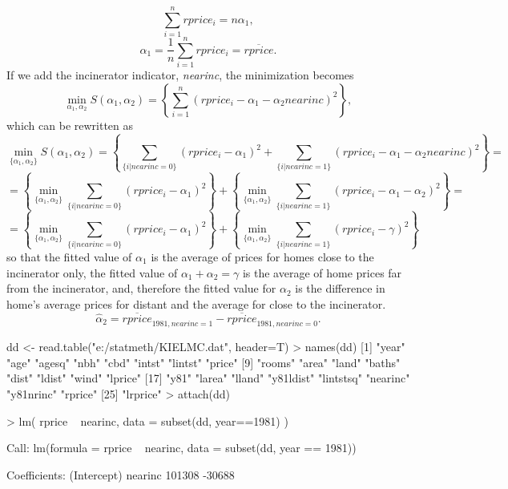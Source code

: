 \documentclass[landscape,letterpaper,9pt]{article}
\begin{document}
\begin{itemize}
{\[
\sum_{i=1}^n  rprice_i  =  n  \alpha_1,
\]
\[
\alpha_1 = \frac{1}{n} \sum_{i=1}^n  rprice_i = \overline{rprice}.
\]
If we add the incinerator indicator, \textit{nearinc},  the minimization becomes
\[
\min_{\alpha_1, \alpha_2} S( \alpha_1,\alpha_2) = \left\{ \sum_{i=1}^n (rprice_i - \alpha_1 - \alpha_2 nearinc)^2 \right\},
\]
which can be rewritten as
\[
\min_{\{\alpha_1, \alpha_2\}} S( \alpha_1,\alpha_2) = \left\{ \sum_{\{i| nearinc=0\}} (rprice_i - \alpha_1)^2 +
 \sum_{\{i| nearinc=1\}} (rprice_i - \alpha_1 - \alpha_2 nearinc)^2 \right\}=
\]
\[
=\left\{ \min_{\{\alpha_1, \alpha_2\}}  \sum_{\{i| nearinc=0\}} (rprice_i - \alpha_1)^2\right\} +
\left\{  \min_{\{\alpha_1, \alpha_2\}}   \sum_{\{i| nearinc=1\}} (rprice_i - \alpha_1 - \alpha_2)^2 \right\}=
\]
\[
=\left\{ \min_{\{\alpha_1, \alpha_2\}}  \sum_{\{i| nearinc=0\}} (rprice_i - \alpha_1)^2\right\} +
\left\{  \min_{\{\alpha_1, \alpha_2\}}   \sum_{\{i| nearinc=1\}} (rprice_i  - \gamma)^2 \right\}
\]
so that the fitted value of \(\alpha_1\) is the average of prices for homes close to the incinerator only, the fitted value
of \(\alpha_1+\alpha_2 = \gamma\) is the average of home prices far from the incinerator, and, therefore
the fitted value for \(\alpha_2\) is the difference in home's average prices for distant and the average for close
to the incinerator.
}
\[\widehat{\alpha}_2 = \overline{rprice}_{1981,nearinc=1} - \overline{rprice}_{1981,nearinc=0}.\]

\end{itemize}

\begin{CVerbatim}
dd <- read.table("e:/statmeth/KIELMC.dat", header=T)
> names(dd)
 [1] "year"     "age"      "agesq"    "nbh"      "cbd"      "intst"    "lintst"   "price"
 [9] "rooms"    "area"     "land"     "baths"    "dist"     "ldist"    "wind"     "lprice"
[17] "y81"      "larea"    "lland"    "y81ldist" "lintstsq" "nearinc"  "y81nrinc" "rprice"
[25] "lrprice"
> attach(dd)

> lm( rprice ~ nearinc, data = subset(dd, year==1981) )

Call:
lm(formula = rprice ~ nearinc, data = subset(dd, year == 1981))

Coefficients:
(Intercept)      nearinc
     101308       -30688
\end{CVerbatim}
\end{document}
